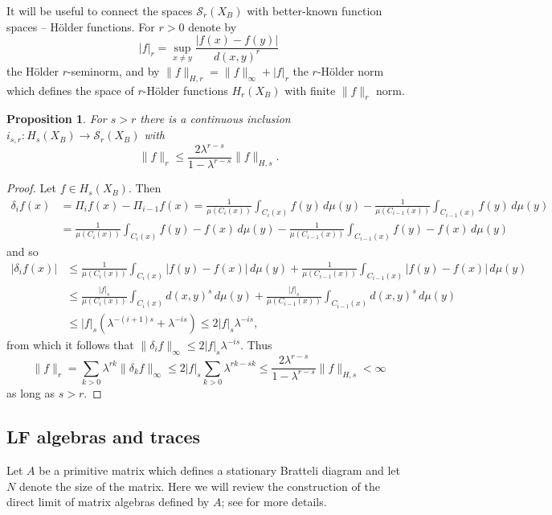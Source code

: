 \documentclass[12pt]{amsart}
\theoremstyle{plain}
\newtheorem{proposition}{Proposition}[section]
\theoremstyle{definition}
\begin{document}
It will be useful to connect the spaces $\mathcal{S} _r(X_B)$ with better-known function spaces -- H\"older functions. For $r>0$ denote by
$$|f|_r = \sup_{x\neq y}\frac{|f(x)-f(y)|}{d(x,y)^r}$$
the H\"older $r$-seminorm, and by $\|f\|_{H,r} = \|f\|_\infty + |f|_r$ the $r$-H\"older norm which defines the space of $r$-H\"older functions $H_r(X_B)$ with finite $\|f\|_r$ norm.
\begin{proposition}
    For $s>r$ there is a continuous inclusion $i_{s,r}:H_s(X_B)\rightarrow  \mathcal{S} _r(X_B)$ with 
    $$\|f\|_r  \leq \frac{2 \lambda^{r-s}}{1-\lambda^{r-s}}\|f\|_{H,s}.$$
\end{proposition}
\begin{proof}
    Let $f\in H_s(X_B)$. Then
    \begin{equation*}
    \begin{split}    
    \delta _i f(x) &= \Pi _if(x)-\Pi _{i-1}f(x) = \frac{1}{\mu(C_i(x))}\int_{C_i(x)} f(y) \, d\mu(y) - \frac{1}{\mu(C_{i-1}(x))}\int_{C_{i-1}(x)} f(y) \, d\mu(y) \\
    &= \frac{1}{\mu(C_i(x))}\int_{C_i(x)} f(y)-f(x) \, d\mu(y) - \frac{1}{\mu(C_{i-1}(x))}\int_{C_{i-1}(x)} f(y) -f(x)\, d\mu(y)
    \end{split} 
    \end{equation*}
    and so 
    \begin{equation*}
    \begin{split}    
    |\delta _i f(x)| &\leq  \frac{1}{\mu(C_i(x))}\int_{C_i(x)} |f(y)-f(x)| \, d\mu(y) + \frac{1}{\mu(C_{i-1}(x))}\int_{C_{i-1}(x)} |f(y) -f(x)|\, d\mu(y) \\
    &\leq  \frac{|f|_s}{\mu(C_i(x))}\int_{C_i(x)} d(x,y)^s \, d\mu(y) + \frac{|f|_s}{\mu(C_{i-1}(x))}\int_{C_{i-1}(x)} d(x,y)^s\, d\mu(y) \\
    &\leq |f|_s(\lambda^{-(i+1)s} + \lambda^{-is}) \leq 2 |f|_s \lambda^{-is},
    \end{split}  
    \end{equation*}
    from which it follows that $\|\delta_i f\|_\infty\leq 2|f|_s\lambda^{-is}$. Thus
    $$\|f\|_r  = \sum_{k>0}\lambda^{rk}\|\delta_k f\|_\infty \leq 2|f|_s\sum_{k>0} \lambda^{rk-sk} \leq \frac{2 \lambda^{r-s}}{1-\lambda^{r-s}}\|f\|_{H,s}<\infty$$
    as long as $s>r$.
\end{proof}
\subsection{LF algebras and traces}
Let $A$ be a primitive matrix which defines a stationary Bratteli diagram and let $N$ denote the size of the matrix. Here we will review the construction of the direct limit of matrix algebras defined by $A$; see \cite{davidson:book} for more details.
\end{document}
